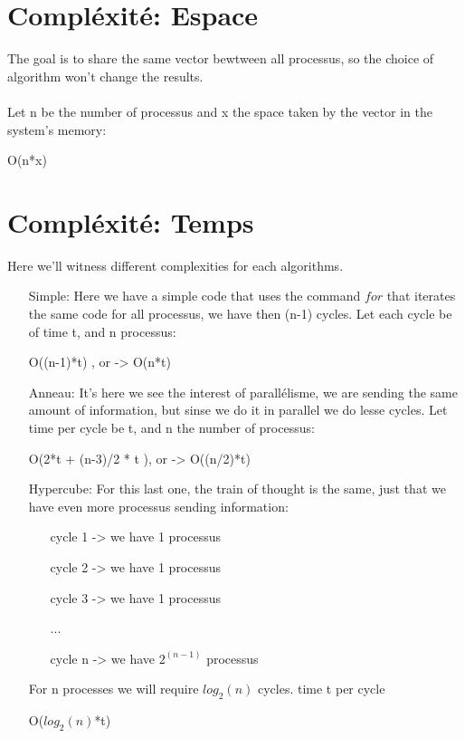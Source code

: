 \documentclass[a4paper]{article}
\begin{document}
\section*{Compléxité: Espace}
The goal is to share the same vector bewtween all processus, so the choice of algorithm won't change the results.\\\\
Let n be the number of processus and x the space taken by the vector in the system's memory:
\begin{center}
O(n*x) 
\end{center}

\section*{Compléxité: Temps}
Here we'll witness different complexities for each algorithms.\\
\begin{itemize}
\item[Simple:] Here we have a simple code that uses the command $for$ that iterates the same code for all processus, we have then (n-1) cycles. Let each cycle be of time t, and n processus:  
\begin{center}
O((n-1)*t) , or ->  O(n*t)
\end{center}


\item[Anneau:] It's here we see the interest of parallélisme, we are sending the same amount of information, but sinse we do it in parallel we do lesse cycles. Let time per cycle be t, and n the number of processus:  
\begin{center}
O(2*t + (n-3)/2 * t ), or ->  O((n/2)*t) 
\end{center}

\item[Hypercube:] For this last one, the train of thought is the same, just that we have even more processus sending information:

\begin{itemize} 
\item[cycle 1 -> ] we have 1 processus
\item[cycle 2 -> ] we have 1 processus
\item[cycle 3 -> ] we have 1 processus
\item[ ... ]
\item[cycle n -> ] we have $2^{(n-1)}$ processus
\end{itemize} 

For n processes we will require $log_{2}(n)$ cycles. time t per cycle
\begin{center}
O($log_{2}(n)$*t) 
\end{center}
\end{itemize}
\end{document}
